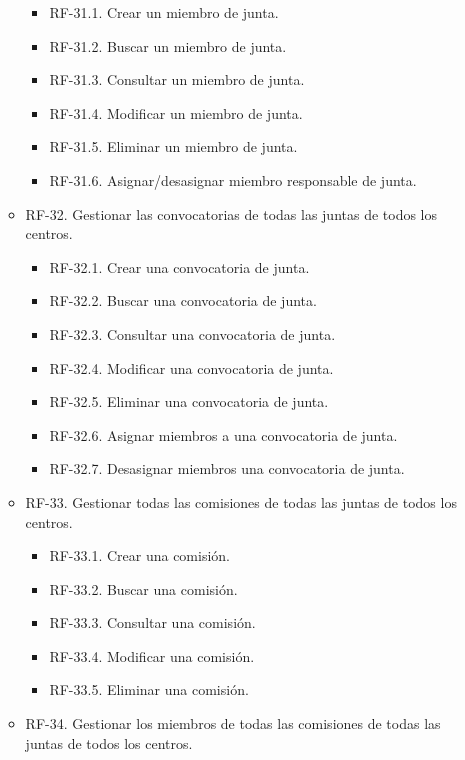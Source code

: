 \begin{itemize}
\begin{itemize}
             \begin{itemize}
                  \item RF-31.1. Crear un miembro de junta.
                  \item RF-31.2. Buscar un miembro de junta.
                  \item RF-31.3. Consultar un miembro de junta.
                  \item RF-31.4. Modificar un miembro de junta.
                  \item RF-31.5. Eliminar un miembro de junta.
                  \item RF-31.6. Asignar/desasignar miembro responsable de junta.
             \end{itemize}
        \item RF-32. Gestionar las convocatorias de todas las juntas de todos los centros.
             \begin{itemize}
                  \item RF-32.1. Crear una convocatoria de junta.
                  \item RF-32.2. Buscar una convocatoria de junta.
                  \item RF-32.3. Consultar una convocatoria de junta.
                  \item RF-32.4. Modificar una convocatoria de junta.
                  \item RF-32.5. Eliminar una convocatoria de junta.
                  \item RF-32.6. Asignar miembros a una convocatoria de junta.
                  \item RF-32.7. Desasignar miembros una convocatoria de junta.
             \end{itemize}
        \item RF-33. Gestionar todas las comisiones de todas las juntas de todos los centros.
             \begin{itemize}
                  \item RF-33.1. Crear una comisión.
                  \item RF-33.2. Buscar una comisión.
                  \item RF-33.3. Consultar una comisión.
                  \item RF-33.4. Modificar una comisión.
                  \item RF-33.5. Eliminar una comisión.
             \end{itemize}    
          \item RF-34. Gestionar los miembros de todas las comisiones de todas las juntas de todos los centros.

\end{itemize}
\end{itemize}
